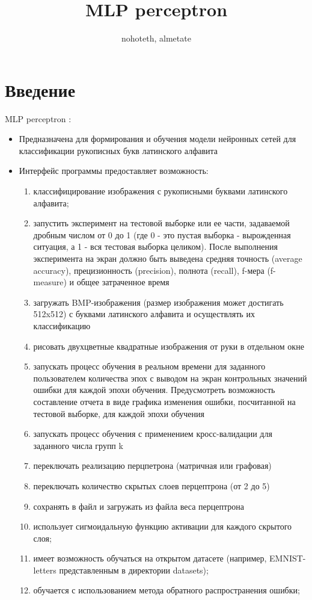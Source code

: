\documentclass{article}
\title{MLP perceptron}
\author{nohoteth, almetate}
\begin{document}
\maketitle

\section{Введение}
MLP perceptron :
    \begin{itemize}
        \item Предназначена для формирования и обучения модели нейронных сетей для классификации рукописных букв латинского алфавита
        \item Интерфейс программы предоставляет возможность:
        \begin{enumerate}
            \item классифицирование изображения с рукописными буквами латинского алфавита;
            \item запустить эксперимент на тестовой выборке или ее части, задаваемой дробным числом от 0 до 1 (где 0 - это пустая выборка - вырожденная ситуация, а 1 - вся тестовая выборка целиком). После выполнения эксперимента на экран должно быть выведена средняя точность (average accuracy), прецизионность (precision), полнота (recall), f-мера (f-measure) и общее затраченное время
            \item загружать BMP-изображения (размер изображения может достигать 512x512) с буквами латинского алфавита и осуществлять их классификацию
            \item рисовать двухцветные квадратные изображения от руки в отдельном окне
            \item запускать процесс обучения в реальном времени для заданного пользователем количества эпох с выводом на экран контрольных значений ошибки для каждой эпохи обучения. Предусмотреть возможность составление отчета в виде графика изменения ошибки, посчитанной на тестовой выборке, для каждой эпохи обучения
            \item запускать процесс обучения с применением кросс-валидации для заданного числа групп k
            \item переключать реализацию перцпетрона (матричная или графовая)
            \item переключать количество скрытых слоев перцептрона (от 2 до 5)
            \item сохранять в файл и загружать из файла веса перцептрона
            \item использует сигмоидальную функцию активации для каждого скрытого слоя;
            \item имеет возможность обучаться на открытом датасете (например, EMNIST-letters представленным в директории datasets);
            \item обучается с использованием метода обратного распространения ошибки;
        \end{enumerate}
    \end{itemize}
\end{document}
